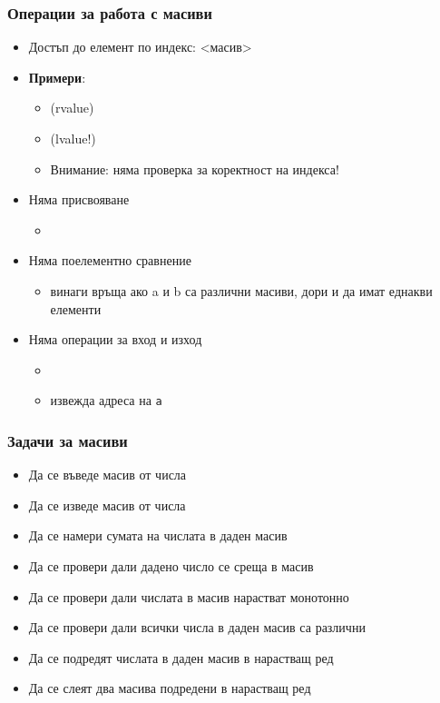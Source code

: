 \documentclass[alsotrans]{beamerswitch}
\begin{document}
\begin{frame}
  \frametitle{Операции за работа с масиви}

  \begin{itemize}[<+->]
  \item Достъп до елемент по индекс: <масив>
  \item \textbf{Примери}:
    \begin{itemize}
    \item {} (\alert{rvalue})
    \item {} (\alert{lvalue!})
    \item \alert{Внимание: няма проверка за коректност на индекса!}
    \end{itemize}
  \item Няма присвояване
    \begin{itemize}
    \item {}
    \end{itemize}
  \item Няма поелементно сравнение
    \begin{itemize}
    \item {} винаги връща  ако \tta a и \tta b са различни масиви, дори и да имат еднакви елементи
    \end{itemize}
  \item Няма операции за вход и изход
    \begin{itemize}
    \item {}
    \item {} извежда адреса на \tt{a}
    \end{itemize}
  \end{itemize}
\end{frame}

\begin{frame}
  \frametitle{Задачи за масиви}

  \begin{itemize}[<+->]
    \item Да се въведе масив от числа
    \item Да се изведе масив от числа
    \item Да се намери сумата на числата в даден масив
    \item Да се провери дали дадено число се среща в масив
    \item Да се провери дали числата в масив нарастват монотонно
    \item Да се провери дали всички числа в даден масив са различни
    \item Да се подредят числата в даден масив в нарастващ ред
    \item Да се слеят два масива подредени в нарастващ ред
  \end{itemize}
\end{frame}
\end{document}
